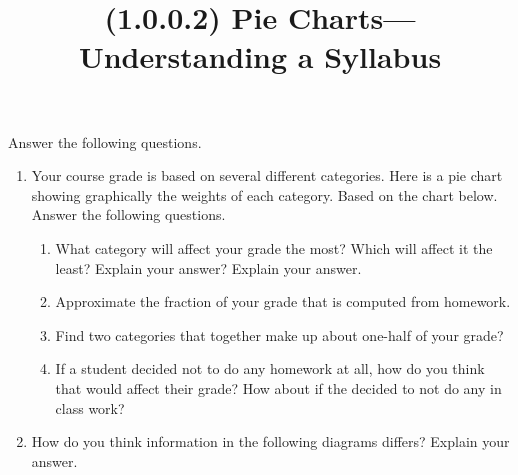 \documentclass{article}
\title{(1.0.0.2) Pie Charts---Understanding a Syllabus}
\begin{document}
Answer the following questions.
\begin{enumerate}
\item Your course grade is based on several different categories. Here is a pie chart showing graphically the weights of each category. Based on the chart below. Answer the following questions.
  \begin{figure}[h!]
    \centering
  \end{figure}
  \begin{enumerate}
  \item What category will affect your grade the most? Which will affect it the least? Explain your answer? Explain your answer.

    \vfill

    \vfill
    
    
  \item Approximate the fraction of your grade that is computed from homework.

    \vfill
    
  \item Find two categories that together make up about one-half of your grade?

    \vfill
    
  \item If a student decided not to do any homework at all, how do you think that would affect their grade? How about if the decided to not do any in class work?

    \vfill

    \vfill
  \end{enumerate}

  \clearpage
\item How do you think information in the following diagrams differs? Explain your answer.


\end{enumerate}
\end{document}
